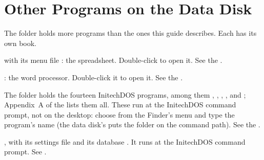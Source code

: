\chapter{Other Programs on the Data Disk}
\label{ch:programs}

The  folder holds more programs than the ones this guide
describes.  Each has its own book.

 with its menu file : the
spreadsheet.  Double-click  to open it.  See the
.

: the word processor.  Double-click it
to open it.  See the .

The  folder holds the fourteen
InitechDOS programs, among them , ,
, ,  and ;
Appendix~A of the  lists them all.
These run at the InitechDOS command prompt, not on the desktop: choose
 from the Finder's  menu
and type the program's name (the data disk's  puts the
 folder on the command path).  See
the .

, with its settings file
 and its database .  It runs at the
InitechDOS command prompt.  See .

